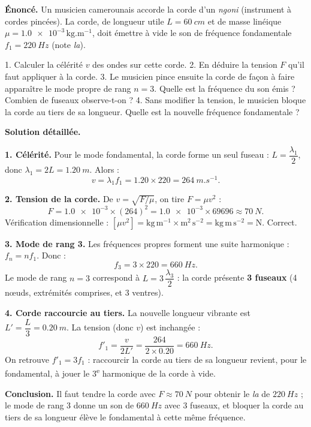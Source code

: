 \documentclass[11pt]{article}
\begin{document}
\begin{exoresolu}
\textbf{Énoncé.} Un musicien camerounais accorde la corde d'un \emph{ngoni} (instrument à cordes pincées). La corde, de longueur utile $L = \SI{60}{cm}$ et de masse linéique $\mu = \num{1,0e-3}\,\mathrm{kg.m^{-1}}$, doit émettre à vide le son de fréquence fondamentale $f_1 = \SI{220}{Hz}$ (note \emph{la}).

1. Calculer la célérité $v$ des ondes sur cette corde.
2. En déduire la tension $F$ qu'il faut appliquer à la corde.
3. Le musicien pince ensuite la corde de façon à faire apparaître le mode propre de rang $n = 3$. Quelle est la fréquence du son émis ? Combien de fuseaux observe-t-on ?
4. Sans modifier la tension, le musicien bloque la corde au tiers de sa longueur. Quelle est la nouvelle fréquence fondamentale ?

\tcblower
\textbf{Solution détaillée.}

\textbf{1. Célérité.} Pour le mode fondamental, la corde forme un seul fuseau : $L = \dfrac{\lambda_1}{2}$, donc $\lambda_1 = 2L = \SI{1,20}{m}$. Alors :
\[ v = \lambda_1 f_1 = \num{1,20} \times 220 = \SI{264}{m.s^{-1}}. \]

\textbf{2. Tension de la corde.} De $v = \sqrt{F/\mu}$, on tire $F = \mu v^2$ :
\[ F = \num{1,0e-3} \times (264)^2 = \num{1,0e-3} \times \num{69696} \approx \SI{70}{N}. \]
Vérification dimensionnelle : $[\mu v^2] = \mathrm{kg\,m^{-1}} \times \mathrm{m^2\,s^{-2}} = \mathrm{kg\,m\,s^{-2}} = \mathrm{N}$. Correct.

\textbf{3. Mode de rang 3.} Les fréquences propres forment une suite harmonique : $f_n = n f_1$. Donc :
\[ f_3 = 3 \times 220 = \SI{660}{Hz}. \]
Le mode de rang $n = 3$ correspond à $L = 3\,\dfrac{\lambda_3}{2}$ : la corde présente \textbf{3 fuseaux} (4 nœuds, extrémités comprises, et 3 ventres).

\textbf{4. Corde raccourcie au tiers.} La nouvelle longueur vibrante est $L' = \dfrac{L}{3} = \SI{0,20}{m}$. La tension (donc $v$) est inchangée :
\[ f'_1 = \frac{v}{2L'} = \frac{264}{2 \times \num{0,20}} = \SI{660}{Hz}. \]
On retrouve $f'_1 = 3 f_1$ : raccourcir la corde au tiers de sa longueur revient, pour le fondamental, à jouer le 3\textsuperscript{e} harmonique de la corde à vide.

\textbf{Conclusion.} Il faut tendre la corde avec $F \approx \SI{70}{N}$ pour obtenir le \emph{la} de $\SI{220}{Hz}$ ; le mode de rang 3 donne un son de $\SI{660}{Hz}$ avec 3 fuseaux, et bloquer la corde au tiers de sa longueur élève le fondamental à cette même fréquence.
\end{exoresolu}
\end{document}
